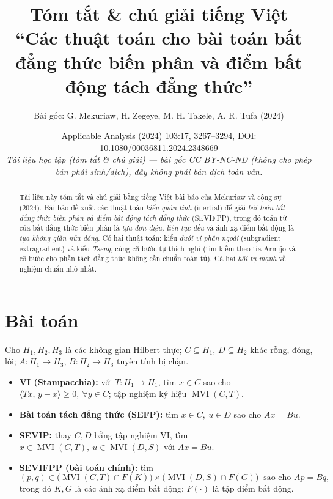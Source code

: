 \documentclass[11pt,a4paper]{article}
\title{\vspace{-1.2cm}\bfseries Tóm tắt \& chú giải tiếng Việt\\[4pt]
\large ``Các thuật toán cho bài toán bất đẳng thức biến phân và điểm bất động tách đẳng thức''}
\author{\normalsize Bài gốc: G. Mekuriaw, H. Zegeye, M. H. Takele, A. R. Tufa (2024)}
\date{\small Applicable Analysis (2024) 103:17, 3267--3294, DOI: 10.1080/00036811.2024.2348669\\[2pt]
\textit{Tài liệu học tập (tóm tắt \& chú giải) --- bài gốc CC BY-NC-ND (không cho phép bản phái sinh/dịch), đây không phải bản dịch toàn văn.}}
\theoremstyle{plain}
\theoremstyle{definition}
\newcommand{\inp}[2]{\langle #1,\,#2\rangle}
\newcommand{\Fix}{F}
\DeclareMathOperator{\MVI}{MVI}
\begin{document}
\maketitle

\begin{abstract}
\noindent Tài liệu này tóm tắt và chú giải bằng tiếng Việt bài báo của Mekuriaw và cộng sự (2024). Bài báo đề xuất các thuật toán \emph{kiểu quán tính} (inertial) để giải \emph{bài toán bất đẳng thức biến phân và điểm bất động tách đẳng thức} (SEVIFPP), trong đó toán tử của bất đẳng thức biến phân là \emph{tựa đơn điệu, liên tục đều} và ánh xạ điểm bất động là \emph{tựa không giãn nửa đóng}. Có hai thuật toán: kiểu \emph{dưới vi phân ngoài} (subgradient extragradient) và kiểu \emph{Tseng}, cùng cỡ bước tự thích nghi (tìm kiếm theo tia Armijo và cỡ bước cho phần tách đẳng thức không cần chuẩn toán tử). Cả hai \emph{hội tụ mạnh} về nghiệm chuẩn nhỏ nhất.
\end{abstract}

\section{Bài toán}

Cho $H_1,H_2,H_3$ là các không gian Hilbert thực; $C\subseteq H_1$, $D\subseteq H_2$ khác rỗng, đóng, lồi; $A:H_1\to H_3$, $B:H_2\to H_3$ tuyến tính bị chặn.

\begin{itemize}[leftmargin=1.4em,itemsep=2pt]
\item \textbf{VI (Stampacchia):} với $T:H_1\to H_1$, tìm $x\in C$ sao cho $\inp{Tx}{y-x}\ge 0,\ \forall y\in C$; tập nghiệm ký hiệu $\MVI(C,T)$.
\item \textbf{Bài toán tách đẳng thức (SEFP):} tìm $x\in C,\ u\in D$ sao cho $Ax=Bu$.
\item \textbf{SEVIP:} thay $C,D$ bằng tập nghiệm VI, tìm $x\in\MVI(C,T),\ u\in\MVI(D,S)$ với $Ax=Bu$.
\item \textbf{SEVIFPP (bài toán chính):} tìm
\[
(p,q)\in\bigl(\MVI(C,T)\cap \Fix(K)\bigr)\times\bigl(\MVI(D,S)\cap \Fix(G)\bigr)\ \text{ sao cho } Ap=Bq,
\]
trong đó $K,G$ là các ánh xạ điểm bất động; $\Fix(\cdot)$ là tập điểm bất động.
\end{itemize}
\end{document}

